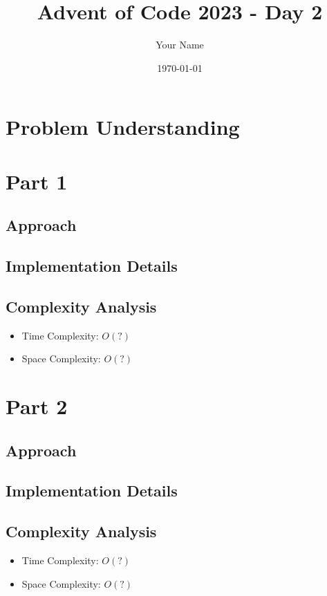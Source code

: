 \documentclass{article}
\title{Advent of Code 2023 - Day 2}
\author{Your Name}
\date{\today}
\begin{document}
\maketitle

\section{Problem Understanding}

\section{Part 1}
\subsection{Approach}

\subsection{Implementation Details}

\subsection{Complexity Analysis}
\begin{itemize}
    \item Time Complexity: $O(?)$
    \item Space Complexity: $O(?)$
\end{itemize}

\section{Part 2}
\subsection{Approach}

\subsection{Implementation Details}

\subsection{Complexity Analysis}
\begin{itemize}
    \item Time Complexity: $O(?)$
    \item Space Complexity: $O(?)$
\end{itemize}
\end{document}
